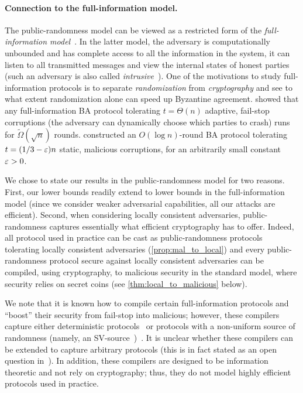 \paragraph{Connection to the full-information model.}
The public-randomness model can be viewed as a restricted form of the \emph{full-information model}~\cite{CC84,BL85,GGL98,BB98,BPV06,GPV06,KKKSS08,Lewko11,KS13,LL13}. In the latter model, the adversary is computationally unbounded and has complete access to all the information in the system, \ie it can listen to all transmitted messages and view the internal states of honest parties (such an adversary is also called \emph{intrusive}~\cite{CC84}). One of the motivations to study full-information protocols is to separate \emph{randomization} from \emph{cryptography} and see to what extent randomization alone can speed up Byzantine agreement. \citet{BB98} showed that any full-information BA protocol tolerating $t=\Theta(n)$ adaptive, fail-stop corruptions (\ie the adversary can dynamically choose which parties to crash) runs for $\tilde \Omega(\sqrt{n})$ rounds. \citet{GPV06} constructed an $O(\log{n})$-round BA protocol tolerating $t=(1/3-\varepsilon)n$ static, malicious corruptions, for an arbitrarily small constant $\varepsilon>0$.

We chose to state our results in the public-randomness model for two reasons. First, our lower bounds readily extend to lower bounds in the full-information model (since we consider weaker adversarial capabilities, \eg all our attacks are efficient). Second, when considering locally consistent adversaries, public-randomness captures essentially what efficient cryptography has to offer. Indeed, all protocol used in practice can be cast as public-randomness protocols tolerating locally consistent adversaries (\cref{prop:mal_to_local}) and every public-randomness protocol secure against locally consistent adversaries can be compiled, using cryptography, to malicious security in the standard model, where security relies on secret coins (see \cref{thm:local_to_malicious} below).

We note that it is known how to compile certain full-information protocols and ``boost'' their security from fail-stop into malicious; however, these compilers capture either deterministic protocols~\cite{Hadzilacos87,Bracha84,NT90} or protocols with a non-uniform source of randomness (namely, an SV-source~\cite{SV84})~\cite{GPV06}. It is unclear whether these compilers can be extended to capture arbitrary protocols (this is in fact stated as an open question in~\cite{Bracha84,GPV06}).
In addition, these compilers are designed to be information theoretic and not rely on cryptography; thus, they do not model highly efficient protocols used in practice.

